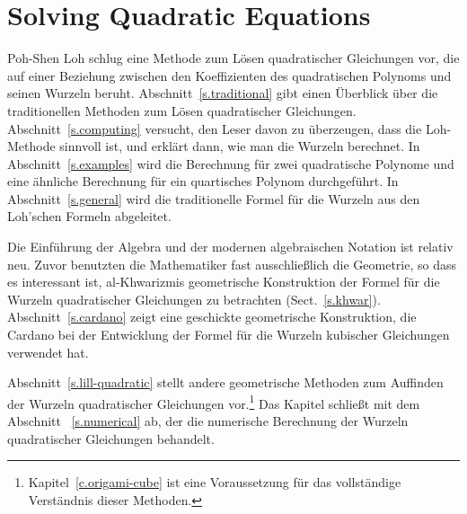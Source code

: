 
\chapter{Solving Quadratic Equations}\label{c.quadratic}


Poh-Shen Loh schlug eine Methode zum Lösen quadratischer Gleichungen vor, die auf einer Beziehung zwischen den Koeffizienten des quadratischen Polynoms und seinen Wurzeln beruht. Abschnitt~\ref{s.traditional} gibt einen Überblick über die traditionellen Methoden zum Lösen quadratischer Gleichungen. 
Abschnitt~\ref{s.computing} versucht, den Leser davon zu überzeugen, dass die Loh-Methode sinnvoll ist, und erklärt dann, wie man die Wurzeln berechnet. In Abschnitt~\ref{s.examples} wird die Berechnung für zwei quadratische Polynome und eine ähnliche Berechnung für ein quartisches Polynom durchgeführt. In Abschnitt~\ref{s.general} wird die traditionelle Formel für die Wurzeln aus den Loh'schen Formeln abgeleitet.

Die Einführung der Algebra und der modernen algebraischen Notation ist relativ neu. Zuvor benutzten die Mathematiker fast ausschließlich die Geometrie, so dass es interessant ist, al-Khwarizmis geometrische Konstruktion der Formel für die Wurzeln quadratischer Gleichungen zu betrachten (Sect.~\ref{s.khwar}). Abschnitt~\ref{s.cardano} zeigt eine geschickte geometrische Konstruktion, die Cardano bei der Entwicklung der Formel für die Wurzeln kubischer Gleichungen verwendet hat.

Abschnitt~\ref{s.lill-quadratic} stellt andere geometrische Methoden zum Auffinden der Wurzeln quadratischer Gleichungen vor.\footnote{Kapitel~\ref{c.origami-cube} ist eine Voraussetzung für das vollständige Verständnis dieser Methoden.} Das Kapitel schließt mit dem Abschnitt ~\ref{s.numerical} ab, der die numerische Berechnung der Wurzeln quadratischer Gleichungen behandelt.

